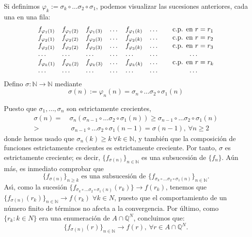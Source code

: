 \documentclass[11pt, a4paper]{article}
\makeatletter
\newif\IfInSansMode
\let\oldsf\sffamily
\renewcommand*{\sffamily}{\oldsf\mathversion{sans}\InSansModetrue}
\let\oldnorm\normalfont
\renewcommand*{\normalfont}{\oldnorm\InSansModefalse\mathversion{normal}}
\renewenvironment{proof}[1][\proofname] {\par\pushQED{\qed}\normalfont\topsep6\p@\@plus6\p@\relax\trivlist\item[\hskip\labelsep\itshape\sffamily#1\@addpunct{.}]\ignorespaces}{\popQED\endtrivlist\@endpefalse}
\theoremstyle{theorem-style}
\theoremstyle{definition-style}
\theoremstyle{remark-style}
\theoremstyle{example-style}
\makeatother
\begin{document}
\begin{proof}
    Si definimos $\varphi_k:= \sigma_k \circ \dots \sigma_2 \circ\sigma_1$, podemos visualizar las sucesiones anteriores, cada una en una fila:
    \[
      \begin{array}{lllllll}
        {f_{\varphi_1 (1)}}& f_{\varphi_1 (2)} & f_{\varphi_1 (3)} & \dots &f_{\varphi_1 (k)} & \dots & \hspace{0.25cm} \mbox{ c.p. en } r=r_1
        \\
        f_{\varphi_2 (1)} & {f_{\varphi_2 (2)}} & f_{\varphi_2 (3)} & \dots &f_{\varphi_2 (k)} & \dots & \hspace{0.25cm} \mbox{ c.p. en } r=r_2
        \\
        f_{\varphi_3 (1)} & f_{\varphi_3 (2)} & {f_{\varphi_3 (3)}} & \dots &f_{\varphi_3 (k)} & \dots & \hspace{0.25cm} \mbox{ c.p. en } r=r_3
        \\
        \dots & \dots & \dots& \dots &\dots & \dots & \hspace{1.25cm} \dots
        \\
        f_{\varphi_k (1)} & f_{\varphi_k (2)} & f_{\varphi_k (3)} & \dots &{f_{\varphi_k (k)}} & \dots & \hspace{0.25cm} \mbox{ c.p. en } r=r_k
        \\
        \dots & \dots & \dots& \dots &\dots & \dots & \hspace{1.25cm} \dots
      \end{array}
    \]
    Defino $\sigma:\mathbb N\longrightarrow \mathbb N$ mediante
    \[
      \sigma (n):= \varphi_n(n)= \sigma_n \circ \dots \sigma_2 \circ\sigma_1 (n)
    \]

    Puesto que $\sigma_1, \dots ,\sigma_n$ son estrictamente crecientes, 
    \[
      \begin{aligned}
        \sigma (n) = \ & \sigma_n ( \sigma_{n-1} \circ \dots \sigma_2 \circ\sigma_1 (n)) 
        \geq \sigma_{n-1} \circ \dots \sigma_2 \circ\sigma_1 (n)
        \\
        >& \ \sigma_{n-1} \circ \dots \sigma_2 \circ\sigma_1 (n-1) = \sigma (n-1) , \ \forall n\geq 2
      \end{aligned}
    \]
    donde hemos usado que $\sigma_n(k) \ge k \ \forall k \in \mathbb{N}$, y también que la composición de funciones estrictamente crecientes es estrictamente creciente. Por tanto, $\sigma$ es estrictamente creciente; es decir,  $\{f_{\sigma (n)} \}_{n\in\mathbb N}$ es una subsucesión de $\{f_n\}$. A\'un m\'as, es inmediato comprobar que
    \[
      \{f_{\sigma (n)}\}_{n\geq k} \mbox{ es una subsucesi\'on de } 
      \{ f_{\sigma_k \circ \dots \sigma_2 \circ\sigma_1 (n)}  \}_{n\in\mathbb N} .
    \]
    As\'{\i}, como la sucesión $\{ f_{\sigma_k \circ \dots \sigma_2 \circ\sigma_1 (n)} (r_k) \} \to f(r_k)$, tenemos que $\{f_{\sigma (n)} (r_k) \}_{n\in\mathbb N} \longrightarrow f(r_k)$ $\forall k\in N$, puesto que el comportamiento de un número finito de términos no afecta a la convergencia. Por último, como $\{r_k : k \in N \}$ era una enumeración de $A \cap \mathbb Q^N$, concluimos que:
    \[
      \{f_{\sigma (n)} (r) \}_{n\in\mathbb N} \longrightarrow f(r), \ \forall r\in A\cap \mathbb Q^N.
    \]


\end{proof}
\end{document}
